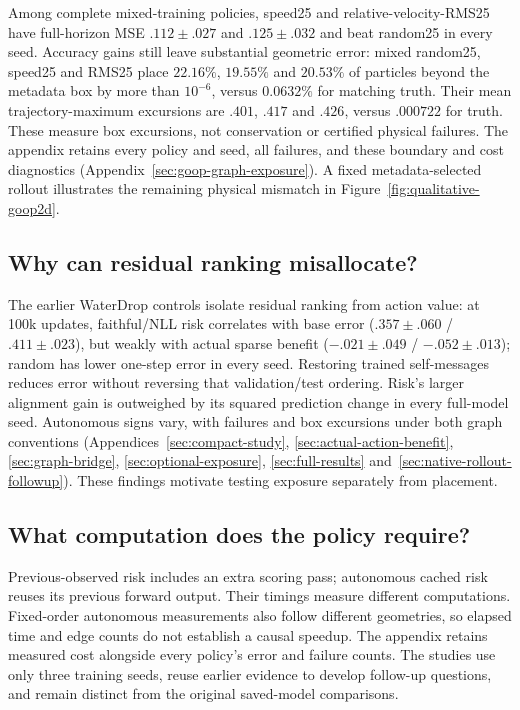 Among complete mixed-training policies, speed25 and relative-velocity-RMS25 have full-horizon MSE $.112\pm.027$ and $.125\pm.032$ and beat random25 in every seed. Accuracy gains still leave substantial geometric error: mixed random25, speed25 and RMS25 place $22.16\%$, $19.55\%$ and $20.53\%$ of particles beyond the metadata box by more than $10^{-6}$, versus $0.0632\%$ for matching truth. Their mean trajectory-maximum excursions are $.401$, $.417$ and $.426$, versus $.000722$ for truth. These measure box excursions, not conservation or certified physical failures. The appendix retains every policy and seed, all failures, and these boundary and cost diagnostics (Appendix~\ref{sec:goop-graph-exposure}). A fixed metadata-selected rollout illustrates the remaining physical mismatch in Figure~\ref{fig:qualitative-goop2d}.

\subsection{Why can residual ranking misallocate?}
The earlier WaterDrop controls isolate residual ranking from action value: at 100k updates, faithful/NLL risk correlates with base error ($.357\pm.060$ / $.411\pm.023$), but weakly with actual sparse benefit ($-.021\pm.049$ / $-.052\pm.013$); random has lower one-step error in every seed. Restoring trained self-messages reduces error without reversing that validation/test ordering. Risk's larger alignment gain is outweighed by its squared prediction change in every full-model seed. Autonomous signs vary, with failures and box excursions under both graph conventions (Appendices~\ref{sec:compact-study}, \ref{sec:actual-action-benefit}, \ref{sec:graph-bridge}, \ref{sec:optional-exposure}, \ref{sec:full-results} and~\ref{sec:native-rollout-followup}). These findings motivate testing exposure separately from placement.

\subsection{What computation does the policy require?}
Previous-observed risk includes an extra scoring pass; autonomous cached risk reuses its previous forward output. Their timings measure different computations. Fixed-order autonomous measurements also follow different geometries, so elapsed time and edge counts do not establish a causal speedup. The appendix retains measured cost alongside every policy's error and failure counts. The studies use only three training seeds, reuse earlier evidence to develop follow-up questions, and remain distinct from the original saved-model comparisons.
